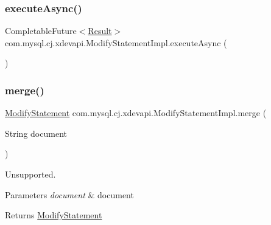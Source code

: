 \mbox{\label{classcom_1_1mysql_1_1cj_1_1xdevapi_1_1_modify_statement_impl_ab4c612ba7dbd0552d3342d150756ee70}} 
\subsubsection{\texorpdfstring{execute\+Async()}{executeAsync()}}
{\footnotesize\ttfamily Completable\+Future$<$\mbox{\hyperlink{interfacecom_1_1mysql_1_1cj_1_1xdevapi_1_1_result}{Result}}$>$ com.\+mysql.\+cj.\+xdevapi.\+Modify\+Statement\+Impl.\+execute\+Async (\begin{DoxyParamCaption}{ }\end{DoxyParamCaption})}

\mbox{\label{classcom_1_1mysql_1_1cj_1_1xdevapi_1_1_modify_statement_impl_acd828dfa9665ae9290662791d1e0da96}} 
\subsubsection{\texorpdfstring{merge()}{merge()}}
{\footnotesize\ttfamily \mbox{\hyperlink{interfacecom_1_1mysql_1_1cj_1_1xdevapi_1_1_modify_statement}{Modify\+Statement}} com.\+mysql.\+cj.\+xdevapi.\+Modify\+Statement\+Impl.\+merge (\begin{DoxyParamCaption}\item[{String}]{document }\end{DoxyParamCaption})}

Unsupported.


\begin{DoxyParams}{Parameters}
{\em document} & document \\
\hline
\end{DoxyParams}
\begin{DoxyReturn}{Returns}
\mbox{\hyperlink{interfacecom_1_1mysql_1_1cj_1_1xdevapi_1_1_modify_statement}{Modify\+Statement}} 
\end{DoxyReturn}


